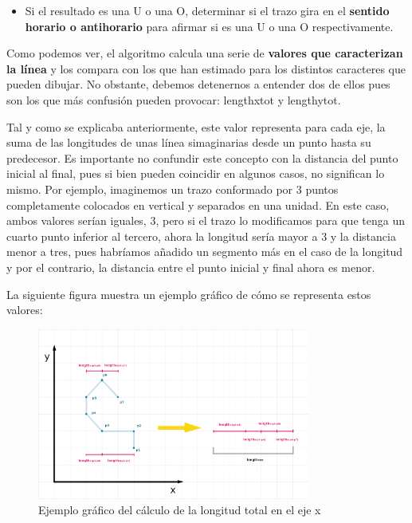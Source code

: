 \begin{itemize}
 \item Si el resultado es una U o una O, determinar si el trazo gira en el \textbf{sentido horario o antihorario} para afirmar si es una U o una O respectivamente.
\end{itemize}

\vspace{0.5cm}

Como podemos ver, el algoritmo calcula una serie de \textbf{valores que caracterizan la línea} y los compara con los que han estimado para los distintos caracteres que pueden dibujar. No obstante, debemos detenernos a entender dos de ellos pues son los que más confusión pueden provocar: lengthxtot y lengthytot.

\vspace{0.5cm}

Tal y como se explicaba anteriormente, este valor representa para cada eje, la suma de las longitudes de unas línea simaginarias desde un punto hasta su predecesor. Es importante no confundir este concepto con la distancia del punto inicial al final, pues si bien pueden coincidir en algunos casos, no significan lo mismo. Por ejemplo, imaginemos un trazo conformado por 3 puntos completamente colocados en vertical y separados en una unidad. En este caso, ambos valores serían iguales, 3, pero si el trazo lo modificamos para que tenga un cuarto punto inferior al tercero, ahora la longitud sería mayor a 3 y la distancia menor a tres, pues habríamos añadido un segmento más en el caso de la longitud y por el contrario, la distancia entre el punto inicial y final ahora es menor.

\vspace{0.5cm}

La siguiente figura muestra un ejemplo gráfico de cómo se representa estos valores:

\vspace{0.5cm}

\begin{figure}[htbp]
\centering
  \includegraphics[width=0.8\textwidth]{archivos/vertline_x.png}
  \caption{Ejemplo gráfico del cálculo de la longitud total en el eje x}
  \label{fig:vertline_x}
\end{figure}

